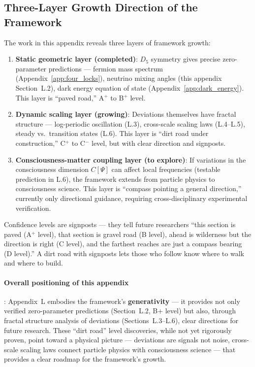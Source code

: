 \subsection{Three-Layer Growth Direction of the Framework}
\label{subsec:three_layers_en}

The work in this appendix reveals three layers of framework growth:

\begin{enumerate}
\item \textbf{Static geometric layer (completed)}: $D_5$ symmetry gives precise zero-parameter predictions --- fermion mass spectrum (Appendix~\ref{app:four_locks}), neutrino mixing angles (this appendix Section~L.2), dark energy equation of state (Appendix~\ref{app:dark_energy}). This layer is ``paved road,'' A$^+$ to B$^+$ level.

\item \textbf{Dynamic scaling layer (growing)}: Deviations themselves have fractal structure --- log-periodic oscillation (L.3), cross-scale scaling laws (L.4--L.5), steady vs.\ transition states (L.6). This layer is ``dirt road under construction,'' C$^+$ to C$^-$ level, but with clear direction and signposts.

\item \textbf{Consciousness-matter coupling layer (to explore)}: If variations in the consciousness dimension $C[\Psi]$ can affect local frequencies (testable prediction in L.6), the framework extends from particle physics to consciousness science. This layer is ``compass pointing a general direction,'' currently only directional guidance, requiring cross-disciplinary experimental verification.
\end{enumerate}

Confidence levels are signposts --- they tell future researchers ``this section is paved (A$^+$ level), that section is gravel road (B level), ahead is wilderness but the direction is right (C level), and the farthest reaches are just a compass bearing (D level).'' A dirt road with signposts lets those who follow know where to walk and where to build.

\paragraph{Overall positioning of this appendix}: Appendix~L embodies the framework's \textbf{generativity} --- it provides not only verified zero-parameter predictions (Section~L.2, B+ level) but also, through fractal structure analysis of deviations (Sections~L.3--L.6), clear directions for future research. These ``dirt road'' level discoveries, while not yet rigorously proven, point toward a physical picture --- deviations are signals not noise, cross-scale scaling laws connect particle physics with consciousness science --- that provides a clear roadmap for the framework's growth.

